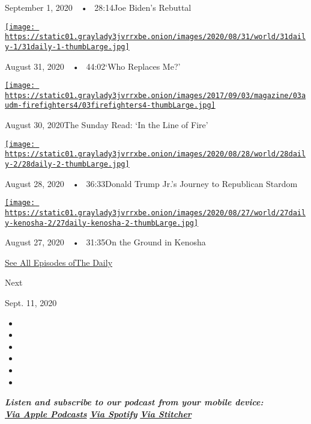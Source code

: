 September 1, 2020~~•~ 28:14Joe Biden's Rebuttal

\href{https://www.nytimes3xbfgragh.onion/2020/08/31/podcasts/the-daily/flint-michigan-police-officer.html?action=click\&module=audio-series-bar\&region=header\&pgtype=Article}{\texttt{[image: https://static01.graylady3jvrrxbe.onion/images/2020/08/31/world/31daily-1/31daily-1-thumbLarge.jpg]}}

August 31, 2020~~•~ 44:02`Who Replaces Me?'

\href{https://www.nytimes3xbfgragh.onion/2020/08/30/podcasts/the-daily/california-wildfires-prisoners.html?action=click\&module=audio-series-bar\&region=header\&pgtype=Article}{\texttt{[image: https://static01.graylady3jvrrxbe.onion/images/2017/09/03/magazine/03audm-firefighters4/03firefighters4-thumbLarge.jpg]}}

August 30, 2020The Sunday Read: `In the Line of Fire'

\href{https://www.nytimes3xbfgragh.onion/2020/08/28/podcasts/the-daily/donald-trump-junior-campaign.html?action=click\&module=audio-series-bar\&region=header\&pgtype=Article}{\texttt{[image: https://static01.graylady3jvrrxbe.onion/images/2020/08/28/world/28daily-2/28daily-2-thumbLarge.jpg]}}

August 28, 2020~~•~ 36:33Donald Trump Jr.'s Journey to Republican
Stardom

\href{https://www.nytimes3xbfgragh.onion/2020/08/27/podcasts/the-daily/kenosha-wisconsin-protests.html?action=click\&module=audio-series-bar\&region=header\&pgtype=Article}{\texttt{[image: https://static01.graylady3jvrrxbe.onion/images/2020/08/27/world/27daily-kenosha-2/27daily-kenosha-2-thumbLarge.jpg]}}

August 27, 2020~~•~ 31:35On the Ground in Kenosha

\href{https://www.nytimes3xbfgragh.onion/column/the-daily}{See All
Episodes ofThe Daily}

Next

Sept. 11, 2020

\begin{itemize}
\item
\item
\item
\item
\item
\item
\end{itemize}

\emph{\textbf{Listen and subscribe to our podcast from your mobile
device:}}\\
\textbf{\href{https://itunes.apple.com/us/podcast/the-daily/id1200361736?mt=2}{\emph{Via
Apple Podcasts}}} \emph{\textbf{\textbar{}}}
\textbf{\href{https://open.spotify.com/show/3IM0lmZxpFAY7CwMuv9H4g?si=SfuMSC55R1qprFsRZU3_zw}{\emph{Via
Spotify}}} \emph{\textbf{\textbar{}}}
\textbf{\href{http://www.stitcher.com/podcast/the-new-york-times/the-daily-10}{\emph{Via
Stitcher}}}

